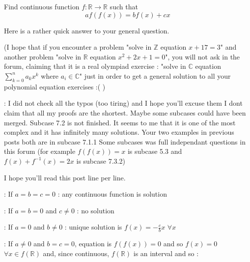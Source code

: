 \begin{solution}
	\begin{tcolorbox}[quote="dien9c"]Find continuous function $f:\mathbb{R} \to \mathbb{R}$ such that
\[a f(f(x)) = b f(x) + cx\]\end{tcolorbox}
Here is a rather quick answer to your general question.

(I hope that if you encounter a problem "solve in $\mathbb Z$ equation $x+17=3$" and another problem "solve in $\mathbb R$ equation $x^2+2x+1=0$", you will not ask in the forum, claiming that it is a real olympiad exercise : "solve in $\mathbb C$ equation $\sum_{k=0}^na_kx^k$ where $a_i\in\mathbb C$" just in order to get a general solution to all your polynomial equation exercises :( )


 :
I did not check all the typos (too tiring) and I hope you'll excuse them
I dont claim that all my proofs are the shortest.
Maybe some subcases could have been merged.
Subcase 7.2 is not finished. It seems to me that it is one of the most complex and it has infinitely many solutions.
Your two examples in previous posts both are in subcase 7.1.1
Some subcases was full independant questions in this forum (for example $f(f(x))=x$ is subcase 5.3 and $f(x)+f^{-1}(x)=2x$ is subcase 7.3.2)

I hope you'll read this post line per line.



 : If $a=b=c=0$ : any continuous function is solution

 : If $a=b=0$ and $c\ne 0$ : no solution

: If $a=0$ and $b\ne 0$ : unique solution is $f(x)=-\frac cbx$ $\forall x$

 : If $a\ne 0$ and $b=c=0$, equation is $f(f(x))=0$ and so $f(x)=0$ $\forall x\in f(\mathbb R)$ and, since continuous, $f(\mathbb R)$ is an interval and so : 


\end{solution}
